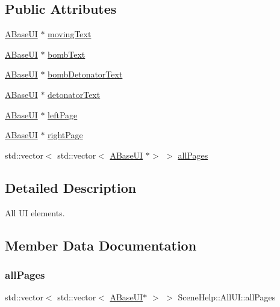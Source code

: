 \subsection*{Public Attributes}
\begin{DoxyCompactItemize}
\item 
\hyperlink{class_a_base_u_i}{A\+Base\+UI} $\ast$ \hyperlink{struct_scene_help_1_1_all_u_i_ad96e5503ebdd34b0adc10a9eb6119ae7}{moving\+Text}
\item 
\hyperlink{class_a_base_u_i}{A\+Base\+UI} $\ast$ \hyperlink{struct_scene_help_1_1_all_u_i_ab0e1105d8d03dd6343b255d371a86446}{bomb\+Text}
\item 
\hyperlink{class_a_base_u_i}{A\+Base\+UI} $\ast$ \hyperlink{struct_scene_help_1_1_all_u_i_a8f7e4b57ab57eae00de7bb32186a8913}{bomb\+Detonator\+Text}
\item 
\hyperlink{class_a_base_u_i}{A\+Base\+UI} $\ast$ \hyperlink{struct_scene_help_1_1_all_u_i_ab4a49940220f4c2b057995265d227d89}{detonator\+Text}
\item 
\hyperlink{class_a_base_u_i}{A\+Base\+UI} $\ast$ \hyperlink{struct_scene_help_1_1_all_u_i_a06ae738b9d7798bb85bc9ed96f6e2561}{left\+Page}
\item 
\hyperlink{class_a_base_u_i}{A\+Base\+UI} $\ast$ \hyperlink{struct_scene_help_1_1_all_u_i_a0e3069e7a066ec6bed4c4f68f92c7ea0}{right\+Page}
\item 
std\+::vector$<$ std\+::vector$<$ \hyperlink{class_a_base_u_i}{A\+Base\+UI} $\ast$$>$ $>$ \hyperlink{struct_scene_help_1_1_all_u_i_a6751dd1c672f9df65c99aa48e09ca713}{all\+Pages}
\end{DoxyCompactItemize}


\subsection{Detailed Description}
All UI elements. 

\subsection{Member Data Documentation}
\mbox{\label{struct_scene_help_1_1_all_u_i_a6751dd1c672f9df65c99aa48e09ca713}} 
\subsubsection{\texorpdfstring{all\+Pages}{allPages}}
{\footnotesize\ttfamily std\+::vector$<$ std\+::vector$<$ \hyperlink{class_a_base_u_i}{A\+Base\+UI}$\ast$ $>$ $>$ Scene\+Help\+::\+All\+U\+I\+::all\+Pages}

